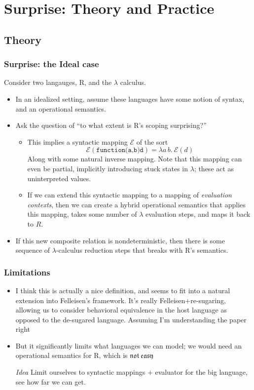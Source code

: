 \documentclass{beamer}
\newcommand{\E}{\mathcal{E}}
\begin{document}
\section{Surprise: Theory and Practice}
\subsection{Theory}
\begin{frame}
  \frametitle{Surprise: the Ideal case}
  Consider two langauges, R, and the $\lambda$ calculus.
  \begin{itemize}
  \item In an idealized setting, assume these languages have some notion of
    syntax, and an operational semantics.
  \item Ask the question of ``to what extent is R's scoping surprising?''
    \begin{itemize}
    \item This implies a syntactic mapping $\E$ of the sort 
      \[
        \E(\texttt{function(a,b)d}) = \lambda a\,b.~\E(d)
      \]    
      Along with some natural inverse mapping. Note that this mapping can even
      be partial, implicitly introducing stuck states in $\lambda$; these act as
      uninterpreted values.

    \item If we can extend this syntactic mapping to a mapping of
      \emph{evaluation contexts}, then we can create a hybrid
      operational semantics that applies this mapping, takes some number of
      $\lambda$ evaluation steps, and maps it back to $R$.
      

    \end{itemize}
  \item If this new composite relation is nondeterministic, then there is some
    sequence of $\lambda$-calculus reduction steps that breaks with R's
    semantics.
  \end{itemize}
  
\end{frame}

\begin{frame}
  \frametitle{Limitations}
  \begin{itemize}

  \item I think this is actually a nice definition, and seems to fit into a
    natural extension into Felleisen's framework. It's really
    Felleisen+re-sugaring, allowing us to consider behavioral equivalence in the
    host language as opposed to the de-sugared language. {\small Assuming I'm
      understanding the paper right}

    \pause

  \item But it significantly limits what languages we can model; we would need
    an operational semantics for R, which is $\mathfrak{not~easy}$
    \pause
    
  \item[\emph{Idea}] Limit ourselves to syntactic mappings + evaluator for the big language,
    see how far we can get.
    
  \end{itemize}
\end{frame}
\end{document}
